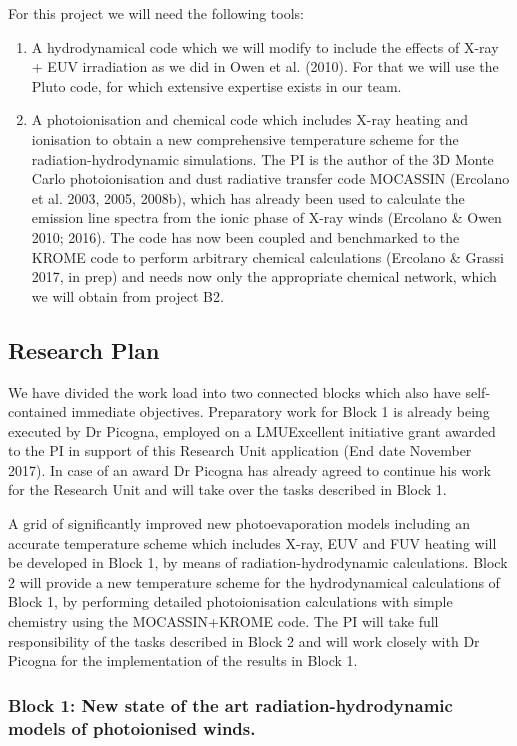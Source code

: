 \documentclass[10pt,fleqn,twoside]{article}
\begin{document}
For this project we will need the following tools: 
\begin{enumerate}
\item A hydrodynamical code which we will modify to include the
  effects of X-ray + EUV irradiation as we did in Owen et al. (2010). For
  that we will use the Pluto code, for which extensive expertise
  exists in our team. 
\item A photoionisation and chemical code which includes X-ray
  heating and ionisation to obtain a new comprehensive temperature
  scheme for the radiation-hydrodynamic simulations. The PI is the
  author of the 3D Monte Carlo photoionisation and dust radiative
  transfer code MOCASSIN (Ercolano et al. 2003, 2005, 2008b),
  which has already been used to calculate the 
  emission line spectra from the ionic phase of X-ray winds (Ercolano
  \& Owen 2010; 2016). The code has
  now been coupled and benchmarked to the KROME code to perform
  arbitrary chemical calculations (Ercolano \& Grassi 2017, in prep)
  and needs now only the appropriate chemical network, which
  we will obtain from project B2.  
\end{enumerate}

\subsection{Research Plan} 

We have divided the work load into two connected blocks which
also have self-contained immediate objectives. Preparatory work for
Block 1 is already being executed by Dr Picogna, employed on a
LMUExcellent initiative grant awarded to the PI in support of
this Research Unit application (End date November 2017). In case of an award Dr Picogna
has already agreed to continue his work for the Research Unit and will
take over the tasks described in Block 1. 

A grid of significantly improved new photoevaporation models including
an accurate temperature scheme which includes X-ray, EUV and FUV
heating will be developed in Block 1, by means of
radiation-hydrodynamic calculations. Block 2 will provide a new
temperature scheme for the hydrodynamical calculations of Block 1, by
performing detailed photoionisation calculations with simple chemistry
using the MOCASSIN+KROME code. The PI will take full responsibility of
the tasks described in Block 2 and will work closely with Dr Picogna
for the implementation of the results in Block 1.  

\subsubsection{Block 1: New state of the art radiation-hydrodynamic
  models of photoionised winds.}
\end{document}

